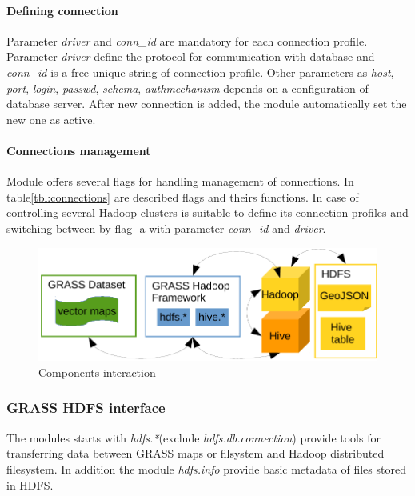 \documentclass[a4paper,12pt,oneside]{report}
\begin{document}
    \paragraph{Defining connection} Parameter \textit{driver} and \textit{conn\_id}
    are mandatory for each connection profile. Parameter \textit{driver} define the
    protocol for communication with database and  \textit{conn\_id} is a free
    unique string of connection profile. Other parameters as \textit{host},
    \textit{port}, \textit{login}, \textit{passwd}, \textit{schema},
    \textit{authmechanism} depends on a configuration of database server. After new
    connection is added, the module automatically set the new one as active. 
    
    \paragraph{Connections management} Module offers several flags for handling
    management of connections. In table\ref{tbl:connections} are described flags and
    theirs functions. In case of controlling several Hadoop clusters is suitable 
    to define its connection profiles and switching between by flag -a with parameter
    \textit{conn\_id} and \textit{driver}.
    
    \begin{figure}[!htbp]
    	\centering
    	\includegraphics[width=1\textwidth]{./img/ghf_overview.pdf}
    	\caption[Components interaction]{\centering Components interaction}
    \end{figure} 
    \subsubsection{GRASS HDFS interface}
    The modules starts with \textit{hdfs.*}(exclude \textit{hdfs.db.connection})
    provide tools for transferring data between GRASS maps or filsystem and Hadoop
    distributed filesystem. In addition the module \textit{hdfs.info} provide basic
    metadata of files stored in HDFS.
    
\end{document}
